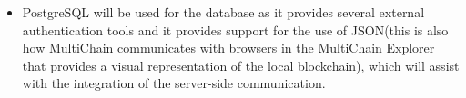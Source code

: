 \begin{itemize}
		\item PostgreSQL will be used for the database as it provides several external authentication tools and it provides support for the use of JSON(this is also how MultiChain communicates with browsers in the MultiChain Explorer that provides a visual representation of the local blockchain), which will assist with the integration of the server-side communication. 
\end{itemize}